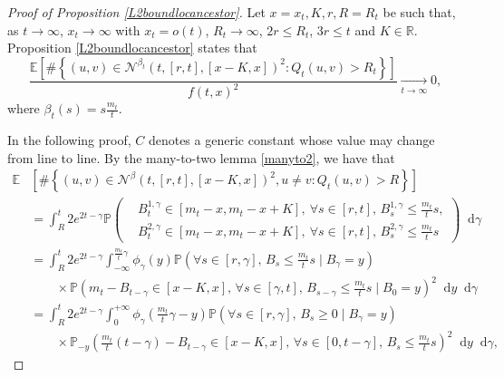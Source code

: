 \documentclass[10pt,a4paper]{amsart}
\newcommand{\E}[0]{\mathbb{E}}
\newcommand{\Prob}{\mathbb{P}}
\begin{document}
\begin{proof}[Proof of Proposition \ref{L2boundlocancestor}]
Let $x=x_t, K, r, R=R_t$ be such that, as $t\to \infty$, \( x_t \to \infty \) with \( x_t = o(t) \), \( R_t \to \infty \), $2r\leq R_t$, $3r \leq t$ and $K\in \mathbb{R}$. Proposition \ref{L2boundlocancestor} states that 
\begin{equation}
    \frac{\E\left[\#\left\{(u,v) \in \mathcal{N}^{\beta_t}(t,[r,t],[x-K,x])^2 : Q_t(u,v) >R_t \right\}\right]}{f(t,x)^2}\xrightarrow[t\rightarrow \infty]{}0,
\end{equation}
where $\beta_t(s)=s\frac{m_t}{t}$.

In the following proof, $C$ denotes a generic constant whose value may change from line to line. By the many-to-two lemma \ref{manyto2}, we have that
\begin{equation}\label{fdfo}
    \begin{aligned}
        \E&\left[\#\left\{(u,v) \in \mathcal{N}^\beta(t,[r,t],[x-K,x])^2, u \neq v : Q_t(u,v) > R \right\}\right] \\
        &= \int_R^t 2e^{2t-\gamma} \Prob\left( 
            \begin{aligned}
                &B^{1,\gamma}_t \in [m_t-x, m_t-x+K], \ \forall s \in [r,t], \, B^{1,\gamma}_s \leq \frac{m_t}{t}s, \\
                &B^{2,\gamma}_t \in [m_t-x, m_t-x+K], \ \forall s \in [r,t], \, B^{2,\gamma}_s \leq \frac{m_t}{t}s
            \end{aligned}
        \right) \mathop{}\!\mathrm{d}\gamma \\
        &= \int_R^t 2e^{2t-\gamma} \int_{-\infty}^{\frac{m_t}{t}\gamma} \phi_\gamma(y) \Prob\left(\forall s \in [r, \gamma], \, B_s \leq \frac{m_t}{t}s \mid B_\gamma = y \right) \\
        &\qquad \times \Prob\left( m_t - B_{t-\gamma} \in [x-K,x], \, \forall s \in [\gamma,t], \, B_{s-\gamma} \leq \frac{m_t}{t}s \mid B_0 = y \right)^2 \mathop{}\!\mathrm{d}y \mathop{}\!\mathrm{d}\gamma \\
        &= \int_R^t 2e^{2t-\gamma} \int_{0}^{+\infty} \phi_\gamma\left(\frac{m_t}{t}\gamma - y\right) \Prob\left(\forall s \in [r, \gamma], \, B_s \geq 0 \mid B_\gamma = y \right) \\
        &\qquad \times \Prob_{-y}\left( \frac{m_t}{t}(t-\gamma) - B_{t-\gamma} \in [x-K,x], \, \forall s \in [0,t-\gamma], \, B_s \leq \frac{m_t}{t}s \right)^2 \mathop{}\!\mathrm{d}y \mathop{}\!\mathrm{d}\gamma,
    \end{aligned}
\end{equation}


\end{proof}
\end{document}
